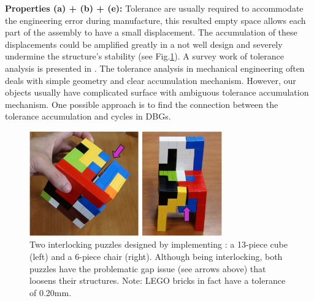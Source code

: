 \vspace*{2mm}
\noindent
{\bf Properties (a) + (b) + (e):} Tolerance are usually required to accommodate the engineering error during manufacture, this resulted empty space allows each part of the assembly to have a small displacement. The accumulation of these displacements could be amplified greatly in a not well design and severely undermine the structure's stability (see Fig.\ref{fig:Gap_Issue}). A survey work of tolerance analysis is presented in \cite{chen2014comprehensive}. The tolerance analysis in mechanical engineering often deals with simple geometry and clear accumulation mechanism. However, our objects usually have complicated surface with ambiguous tolerance accumulation mechanism. One possible approach is to find the connection between the tolerance accumulation and cycles in DBGs. 
\begin{figure}[!b]
	\centering
	\vspace*{-3.0mm}
	\includegraphics[width=8.30cm]{images/Gap_Issue.png}
	\vspace*{-1.0mm}
	\caption{Two  interlocking  puzzles  designed  by  implementing \cite{Song-2012-InterCubes}:  a  13-piece  cube  (left)  and  a  6-piece  chair  (right). Although being interlocking, both puzzles have the problematic gap issue (see arrows above) that loosens their structures. Note: LEGO bricks in fact have a tolerance of 0.20mm.
	}
	\vspace*{-4.5mm}
	\label{fig:Gap_Issue}
\end{figure}